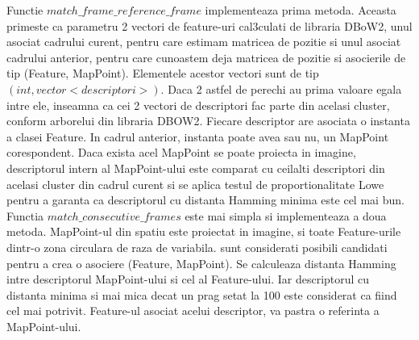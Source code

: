 \documentclass[12pt,a4paper]{report}
\begin{document}
Functie $ match\_frame\_reference\_frame $ implementeaza prima metoda. Aceasta primeste ca 
parametru 2 vectori de feature-uri cal3culati de libraria DBoW2, unul asociat cadrului curent, pentru     
care estimam matricea de pozitie si unul asociat cadrului anterior, pentru care cunoastem deja matricea de pozitie
si asocierile de tip (Feature, MapPoint). Elementele acestor vectori sunt de tip $ (int, vector<descriptori>) $.
Daca 2 astfel de perechi au prima valoare egala intre ele, inseamna ca cei 2 vectori de descriptori fac parte din 
acelasi cluster, conform arborelui din libraria DBOW2. Fiecare descriptor are asociata o instanta a clasei 
Feature. In cadrul anterior, instanta poate avea sau nu, un MapPoint corespondent. Daca exista acel
MapPoint se poate proiecta in imagine, descriptorul intern al MapPoint-ului este comparat cu ceilalti 
descriptori din acelasi cluster din cadrul curent si se aplica testul de proportionalitate Lowe pentru a
garanta ca descriptorul cu distanta Hamming minima este cel mai bun.   
Functia $ match\_consecutive\_frames $ este mai simpla si implementeaza a doua metoda. MapPoint-ul din 
spatiu este proiectat in imagine, si toate Feature-urile dintr-o zona circulara de raza de variabila. 
sunt considerati posibili candidati pentru a crea o asociere (Feature, MapPoint). Se calculeaza distanta 
Hamming intre descriptorul MapPoint-ului si cel al Feature-ului. Iar descriptorul cu distanta minima si 
mai mica decat un prag setat la 100 este considerat ca fiind cel mai potrivit. Feature-ul asociat acelui
descriptor, va pastra o referinta a MapPoint-ului. \\
\end{document}
